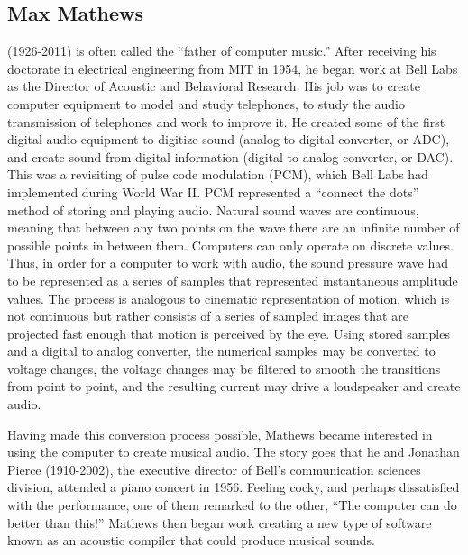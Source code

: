 \subsection{Max Mathews} (1926-2011) is often called the ``father of computer music.'' After receiving his doctorate in electrical engineering from MIT in 1954, he began work at Bell Labs as the Director of Acoustic and Behavioral Research. His job was to create computer equipment to model and study telephones, to study the audio transmission of telephones and work to improve it. He created some of the first digital audio equipment to digitize sound (analog to digital converter, or ADC), and create sound from digital information (digital to analog converter, or DAC).  This was a revisiting of pulse code modulation (PCM), which Bell Labs had implemented during World War II. PCM represented a ``connect the dots'' method of storing and playing audio. Natural sound waves are continuous, meaning that between any two points on the wave there are an infinite number of possible points in between them. Computers can only operate on discrete values. Thus, in order for a computer to work with audio, the sound pressure wave had to be represented as a series of samples that represented instantaneous amplitude values. The process is analogous to cinematic representation of motion, which is not continuous but rather consists of a series of sampled images that are projected fast enough that motion is perceived by the eye. Using stored samples and a digital to analog converter, the numerical samples may be converted to voltage changes, the voltage changes may be filtered to smooth the transitions from point to point, and the resulting current may drive a loudspeaker and create audio.

Having made this conversion process possible, Mathews became interested in using the computer to create musical audio. The story goes that he and Jonathan Pierce (1910-2002), the executive director of Bell's communication sciences division, attended a piano concert in 1956. Feeling cocky, and perhaps dissatisfied with the performance, one of them remarked to the other, ``The computer can do better than this!'' Mathews then began work creating a new type of software known as an acoustic compiler that could produce musical sounds.

